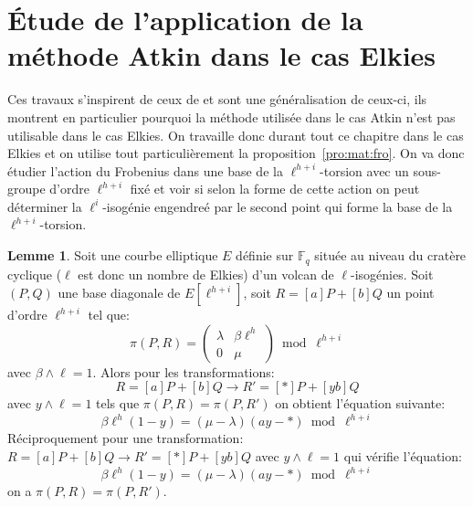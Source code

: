 \documentclass[10pt,a4paper]{book}
\theoremstyle{plain}
\theoremstyle{definition}
\newtheorem{lem}[thm]{Lemme}
\theoremstyle{definition}
\theoremstyle{definition}
\theoremstyle{definition}
\theoremstyle{remark}
\theoremstyle{remark}
\theoremstyle{definition}
\begin{document}
\section{\'Etude de l'application de la méthode Atkin dans le cas Elkies}
Ces travaux s'inspirent de ceux de \cite[Chapitre 6]{Master13} et sont une 
généralisation de ceux-ci, ils montrent en particulier pourquoi la méthode 
utilisée dans le cas Atkin n'est pas utilisable dans le cas Elkies. On 
travaille donc durant tout ce chapitre dans le cas Elkies et on utilise tout
particulièrement la proposition~\ref{pro:mat:fro}. On va donc étudier l'action
du Frobenius dans une base de la $\ell^{h+i}$-torsion avec un sous-groupe 
d'ordre $\ell^{h+i}$ fixé et voir si selon la forme de cette action on peut 
déterminer la $\ell^{i}$-isogénie engendreé par le second point qui forme la 
base de la $\ell^{h+i}$-torsion.

\begin{lem} \label{lem:app:eq}
Soit une courbe elliptique $E$ définie sur $\mathbb{F}_q$ située au niveau du
cratère cyclique ($\ell$ est donc un nombre de Elkies) d'un volcan de 
$\ell$-isogénies. Soit $(P,Q)$ une base diagonale de $E[\ell^{h+i}]$, soit 
$R=[a]P+[b]Q$ un point d'ordre $\ell^{h+i}$ tel que:
\begin{equation}
  \label{eq:mat}
 \pi(P,R)= \left(\begin{array}{cc}
      \lambda & \beta \ell^{h}\\
      0 & \mu
    \end{array}\right) \bmod \ell^{h+i}
\end{equation}
avec $\beta \wedge \ell =1$. Alors pour les transformations:
\begin{equation*}
R=[a]P+[b]Q \rightarrow R'=[*]P+[yb]Q
\end{equation*}
avec $y\wedge \ell=1$ tels que $\pi(P,R)=\pi(P,R')$ on obtient l'équation 
suivante:
\[  \beta \ell^h (1-y) = (\mu - \lambda) (ay-*)  \bmod \ell^{h+i} \]
Réciproquement pour une transformation:
$R=[a]P+[b]Q \rightarrow R'=[*]P+[yb]Q$ avec $y \wedge \ell =1$ qui vérifie 
l'équation:
\[   \beta \ell^h (1-y) = (\mu - \lambda) (ay-*)  \bmod \ell^{h+i} \]
 on a $\pi(P,R)=\pi(P,R')$.
\end{lem}
\end{document}
